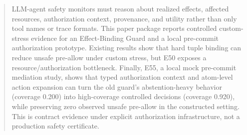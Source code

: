 \begin{abstract}
LLM-agent safety monitors must reason about realized effects, affected resources, authorization context, provenance, and utility rather than only tool names or trace formats. This paper package reports controlled custom-stress evidence for an Effect-Binding Guard and a local pre-commit authorization prototype. Existing results show that hard tuple binding can reduce unsafe pre-allow under custom stress, but E50 exposes a resource/authorization bottleneck. Finally, E55, a local mock pre-commit mediation study, shows that typed authorization context and atom-level action expansion can turn the old guard's abstention-heavy behavior (coverage 0.200) into high-coverage controlled decisions (coverage 0.920), while preserving zero observed unsafe pre-allow in the constructed setting. This is contract evidence under explicit authorization infrastructure, not a production safety certificate.
\end{abstract}
